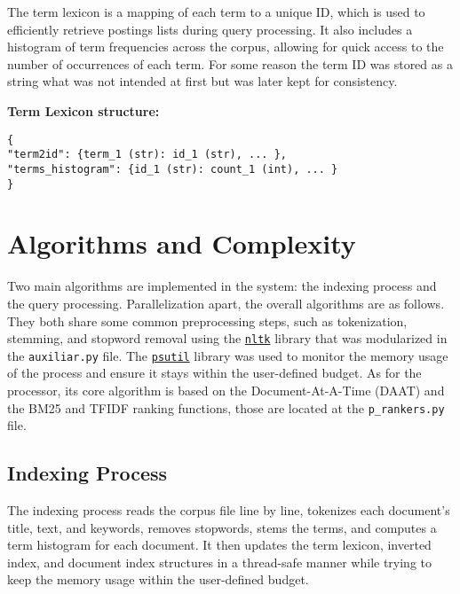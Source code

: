 The term lexicon is a mapping of each term to a unique ID, which is used to efficiently retrieve postings lists during query processing. It also includes a histogram of term frequencies across the corpus, allowing for quick access to the number of occurrences of each term. For some reason the term ID was stored as a string what was not intended at first but was later kept for consistency.

\textbf{Term Lexicon structure:}

\begin{verbatim}
{
"term2id": {term_1 (str): id_1 (str), ... },
"terms_histogram": {id_1 (str): count_1 (int), ... }
}
\end{verbatim}

\section{Algorithms and Complexity} \label{sec:algorithms}

Two main algorithms are implemented in the system: the indexing process and the query processing. Parallelization apart, the overall algorithms are as follows. They both share some common preprocessing steps, such as tokenization, stemming, and stopword removal using the \href{https://www.nltk.org/}{\texttt{nltk}} library that was modularized in the \texttt{auxiliar.py} file. The \href{https://psutil.readthedocs.io/}{\texttt{psutil}} library was used to monitor the memory usage of the process and ensure it stays within the user-defined budget. As for the processor, its core algorithm is based on the Document-At-A-Time (DAAT) and the BM25 and TFIDF ranking functions, those are located at the \texttt{p\_rankers.py} file.

\subsection{Indexing Process} \label{subsec:indexing}

The indexing process reads the corpus file line by line, tokenizes each document's title, text, and keywords, removes stopwords, stems the terms, and computes a term histogram for each document. It then updates the term lexicon, inverted index, and document index structures in a thread-safe manner while trying to keep the memory usage within the user-defined budget.

